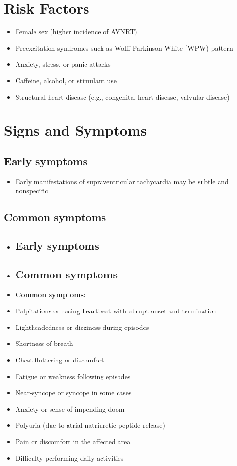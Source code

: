 \section{Risk Factors}

\begin{itemize}[noitemsep]
  \item Female sex (higher incidence of AVNRT)
  \item Preexcitation syndromes such as Wolff-Parkinson-White (WPW) pattern
  \item Anxiety, stress, or panic attacks
  \item Caffeine, alcohol, or stimulant use
  \item Structural heart disease (e.g., congenital heart disease, valvular disease)
\end{itemize}

\section{Signs and Symptoms}

\subsection{Early symptoms}
\begin{itemize}[noitemsep]
  \item Early manifestations of supraventricular tachycardia may be subtle and nonspecific
\end{itemize}

\subsection{Common symptoms}
\begin{itemize}[noitemsep]
  \item \subsection{Early symptoms}
  \item \subsection{Common symptoms}
  \item \textbf{Common symptoms:}
  \item Palpitations or racing heartbeat with abrupt onset and termination
  \item Lightheadedness or dizziness during episodes
  \item Shortness of breath
  \item Chest fluttering or discomfort
  \item Fatigue or weakness following episodes
  \item Near-syncope or syncope in some cases
  \item Anxiety or sense of impending doom
  \item Polyuria (due to atrial natriuretic peptide release)
  \item Pain or discomfort in the affected area
  \item Difficulty performing daily activities
\end{itemize}

